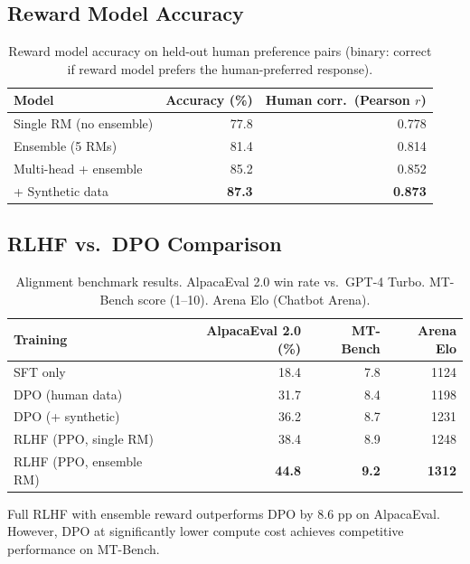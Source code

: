 \documentclass[11pt,a4paper]{article}
\begin{document}
\subsection{Reward Model Accuracy}

\begin{table}[H]
\centering
\caption{Reward model accuracy on held-out human preference pairs (binary: correct
if reward model prefers the human-preferred response).}
\begin{tabular}{lrr}
\toprule
\textbf{Model} & \textbf{Accuracy (\%)} & \textbf{Human corr.\ (Pearson $r$)} \\
\midrule
Single RM (no ensemble)    & 77.8 & 0.778 \\
Ensemble (5 RMs)           & 81.4 & 0.814 \\
Multi-head + ensemble      & 85.2 & 0.852 \\
+ Synthetic data           & \textbf{87.3} & \textbf{0.873} \\
\bottomrule
\end{tabular}
\label{tab:rm_accuracy}
\end{table}

\subsection{RLHF vs.\ DPO Comparison}

\begin{table}[H]
\centering
\caption{Alignment benchmark results. AlpacaEval 2.0 win rate vs.\ GPT-4 Turbo.
MT-Bench score (1--10). Arena Elo (Chatbot Arena).}
\begin{tabular}{lrrr}
\toprule
\textbf{Training} & \textbf{AlpacaEval 2.0 (\%)} & \textbf{MT-Bench} & \textbf{Arena Elo} \\
\midrule
SFT only           & 18.4 & 7.8 & 1124 \\
DPO (human data)   & 31.7 & 8.4 & 1198 \\
DPO (+ synthetic)  & 36.2 & 8.7 & 1231 \\
RLHF (PPO, single RM)     & 38.4 & 8.9 & 1248 \\
RLHF (PPO, ensemble RM)   & \textbf{44.8} & \textbf{9.2} & \textbf{1312} \\
\bottomrule
\end{tabular}
\label{tab:alignment}
\end{table}

Full RLHF with ensemble reward outperforms DPO by 8.6 pp on AlpacaEval. However,
DPO at significantly lower compute cost achieves competitive performance on MT-Bench.
\end{document}
